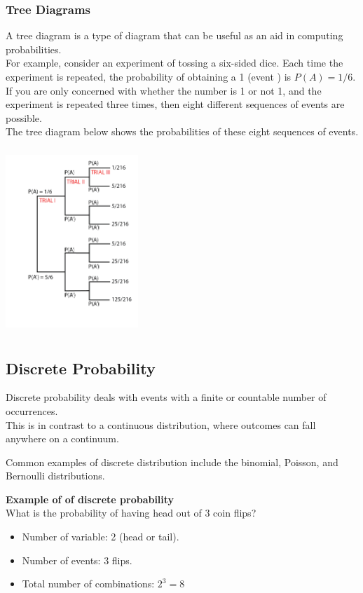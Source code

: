 \documentclass{article}
\begin{document}
\subsubsection{Tree Diagrams}
A tree diagram is a type of diagram that can be useful as an aid in computing probabilities. \\ 
For example, consider an experiment of tossing a six-sided dice. Each
time the experiment is repeated, the probability of obtaining a 1 (event ) is $P(A) = 1 / 6$. 
If you are only concerned with whether the number is 1 or not 1, and the experiment is repeated three times, then eight different sequences of events are possible. \\ 
The tree diagram below shows the probabilities of these eight sequences of events.

\includegraphics[width=5cm, height=7cm]{tree_diagram}

\subsection{Discrete Probability}
Discrete probability deals with events with a finite or countable number of occurrences. \\ 
This is in contrast to a continuous distribution, where outcomes can fall anywhere on a continuum. 

Common examples of discrete distribution include the binomial, Poisson, and Bernoulli distributions.

\textbf{Example of of discrete probability} \\
What is the probability of having head out of 3 coin flips?
\begin{itemize}
    \item Number of variable: 2 (head or tail).
    \item Number of events: 3 flips.
    \item Total number of combinations: $2^3 = 8$
\end{itemize}
\end{document}
